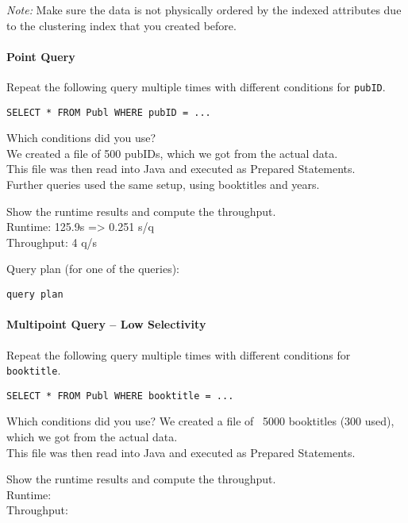\documentclass[11pt]{scrartcl}
\begin{document}
\noindent \emph{Note:} Make sure the data is not physically ordered by
the indexed attributes due to the clustering index that you created
before.

\paragraph{Point Query}

Repeat the following query multiple times with different conditions for {\tt pubID}.

{\small
\begin{verbatim}
SELECT * FROM Publ WHERE pubID = ...
\end{verbatim}
}

\noindent
Which conditions did you use?\\
We created a file of 500 pubIDs, which we got from the actual data.\\
This file was then read into Java and executed as Prepared Statements.\\
Further queries used the same setup, using booktitles and years.

\smallskip\noindent
Show the runtime results and compute the throughput.\\
Runtime: 125.9s => 0.251 s/q\\
Throughput: 4 q/s

\smallskip\noindent
Query plan (for one of the queries):
{\small
\begin{verbatim}
query plan
\end{verbatim}
}


\paragraph{Multipoint Query -- Low Selectivity}

Repeat the following query multiple times with different conditions for {\tt booktitle}.

{\small
\begin{verbatim}
SELECT * FROM Publ WHERE booktitle = ...
\end{verbatim}
}

\noindent
Which conditions did you use?
We created a file of ~5000 booktitles (300 used), which we got from the actual data.\\
This file was then read into Java and executed as Prepared Statements.

\smallskip\noindent
Show the runtime results and compute the throughput.\\
Runtime: \\
Throughput: 
\end{document}
